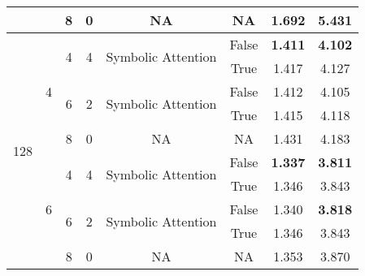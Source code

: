 \begin{tabular}{@{}|c|c|c|c|c|c|c|c|@{}}
                        &                    & 8                  & 0                  & NA                                         & NA           & 1.692          & 5.431          \\ \hline
\multirow{10}{*}{128}   & \multirow{5}{*}{4} & \multirow{2}{*}{4} & \multirow{2}{*}{4} & \multirow{2}{*}{Symbolic Attention}        & False        & \textbf{1.411} & \textbf{4.102} \\
                        &                    &                    &                    &                                            & True         & 1.417          & 4.127          \\ \cline{3-8} 
                        &                    & \multirow{2}{*}{6} & \multirow{2}{*}{2} & \multirow{2}{*}{Symbolic Attention}        & False        & 1.412          & 4.105          \\
                        &                    &                    &                    &                                            & True         & 1.415          & 4.118          \\ \cline{3-8} 
                        &                    & 8                  & 0                  & NA                                         & NA           & 1.431          & 4.183          \\ \cline{2-8} 
                        & \multirow{5}{*}{6} & \multirow{2}{*}{4} & \multirow{2}{*}{4} & \multirow{2}{*}{Symbolic Attention}        & False        & \textbf{1.337} & \textbf{3.811} \\
                        &                    &                    &                    &                                            & True         & 1.346          & 3.843          \\ \cline{3-8} 
                        &                    & \multirow{2}{*}{6} & \multirow{2}{*}{2} & \multirow{2}{*}{Symbolic Attention}        & False        & 1.340          & \textbf{3.818} \\
                        &                    &                    &                    &                                            & True         & 1.346          & 3.843          \\ \cline{3-8} 
                        &                    & 8                  & 0                  & NA                                         & NA           & 1.353          & 3.870          \\ \bottomrule
\end{tabular}%